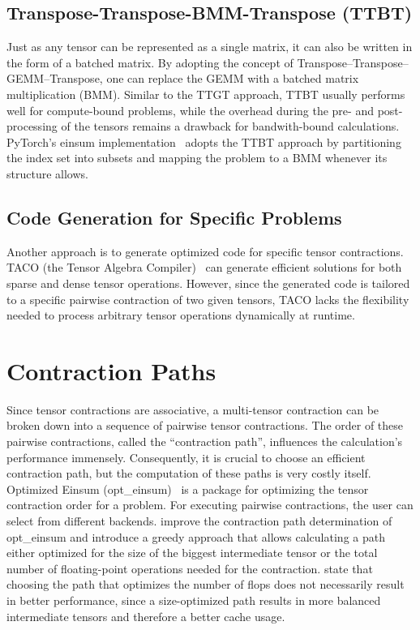 \subsection{Transpose-Transpose-BMM-Transpose (TTBT)}
\sloppy
Just as any tensor can be represented as a single matrix, it can also be written in the form of a batched matrix.
By adopting the concept of Transpose–Transpose–GEMM–Transpose, one can replace the GEMM with a batched matrix multiplication (BMM). Similar to the TTGT approach, TTBT usually performs well for compute-bound problems, while the overhead during the pre- and post-processing of the tensors remains a drawback for bandwith-bound calculations.\\
PyTorch’s einsum implementation~\cite{PyTorch} adopts the TTBT approach by partitioning the index set into subsets and mapping the problem to a BMM whenever its structure allows.

\subsection{Code Generation for Specific Problems}
Another approach is to generate optimized code for specific tensor contractions. TACO (the Tensor Algebra Compiler)~\cite{kjolstad2017taco} can generate efficient solutions for both sparse and dense tensor operations. However, since the generated code is tailored to a specific pairwise contraction of two given tensors, TACO lacks the flexibility needed to process arbitrary tensor operations dynamically at runtime.

\section{Contraction Paths}
Since tensor contractions are associative, a multi-tensor contraction can be broken down into a sequence of pairwise tensor contractions. The order of these pairwise contractions, called the ``contraction path'', influences the calculation's performance immensely. Consequently, it is crucial to choose an efficient contraction path, but the computation of these paths is very costly itself. 
Optimized Einsum (opt\_einsum)~\cite{opteinsum} 
is a package for optimizing the tensor contraction order for a problem. For executing pairwise contractions, the user can select from different backends. \textcite{cgreedy} improve the contraction path determination of opt\_einsum and introduce a greedy approach that allows calculating a path either optimized for the size of the biggest intermediate tensor or the total number of floating-point operations needed for the contraction. \textcite{blacher2024einsum} state that choosing the path that optimizes the number of flops does not necessarily result in better performance, since a size-optimized path results in more balanced intermediate tensors and therefore a better cache usage. 
